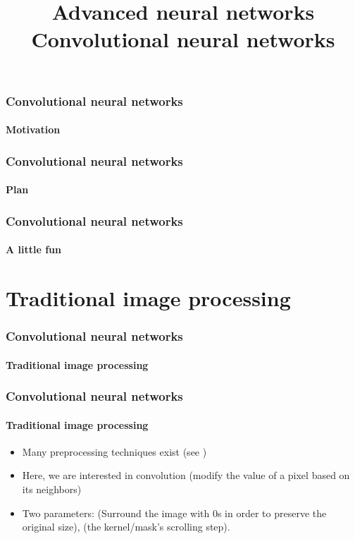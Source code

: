 \documentclass[xcolor=table]{beamer}
\title[ANN: CNN] %
{Advanced neural networks\\Convolutional neural networks}
\begin{document}
\begin{frame}
\frametitle{Convolutional neural networks}
\framesubtitle{Motivation}


\end{frame}

\begin{frame}
\frametitle{Convolutional neural networks}
\framesubtitle{Plan}

\begin{multicols}{2}
	\tableofcontents
\end{multicols}
\end{frame}

\begin{frame}
	\frametitle{Convolutional neural networks}
	\framesubtitle{A little fun}
	
	
\end{frame}

\section{Traditional image processing}

\begin{frame}
\frametitle{Convolutional neural networks}
\framesubtitle{Traditional image processing}

\begin{center}
\end{center}

\end{frame}

\begin{frame}
\frametitle{Convolutional neural networks}
\framesubtitle{Traditional image processing}

\begin{itemize}
	\item Many preprocessing techniques exist (see \cite{2010-alginahi})
	\item Here, we are interested in convolution (modify the value of a pixel based on its neighbors)
	\item Two parameters:  (Surround the image with 0s in order to preserve the original size),  (the kernel/mask's scrolling step).
\end{itemize}

\begin{center}
\end{center}

\end{frame}
\end{document}
